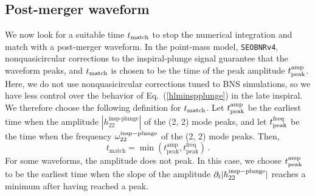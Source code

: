 \documentclass[prd,aps,letter,twocolumn,floatfix,notitlepage,nofootinbib]{revtex4-1}
\newcommand{\red}[1]{\textcolor{red}{#1}}
\begin{document}
\subsection{Post-merger waveform}

We now look for a suitable time $t_{\rm match}$ to stop the numerical integration and match with a post-merger waveform. In the point-mass model, \texttt{SEOBNRv4}, nonquasicircular corrections to the inspiral-plunge signal guarantee that the waveform peaks, and $t_{\rm match}$ is chosen to be the time of the peak amplitude $t_{\rm peak}^{\rm amp}$. Here, we do not use nonquasicircular corrections tuned to BNS simulations, so we have less control over the behavior of Eq.~(\ref{hlminspplunge}) in the late inspiral. We therefore choose the following definition for $t_{\rm match}$. Let $t_{\rm peak}^{\rm amp}$ be the earliest time when the amplitude $|h_{22}^{\textrm{insp-plunge}}|$ of the (2, 2) mode peaks, and let $t_{\rm peak}^{\rm freq}$ be the time when the frequency $\omega_{22}^{\rm insp-plunge}$ of the (2, 2) mode peaks. Then,
\begin{equation}
t_{\textrm{match}} = \min \left(t_{\textrm{peak}}^{\textrm{amp}},t_{\textrm{peak}}^{\textrm{freq}}\right)\,.\label{tmatch}
\end{equation}
For some waveforms, the amplitude does not peak. In this case, we choose $t_{\rm peak}^{\rm amp}$ to be the earliest time when the slope of the amplitude $\partial_t |h_{22}^{\rm insp-plunge}|$ reaches a minimum after having reached a peak.


\end{document}
